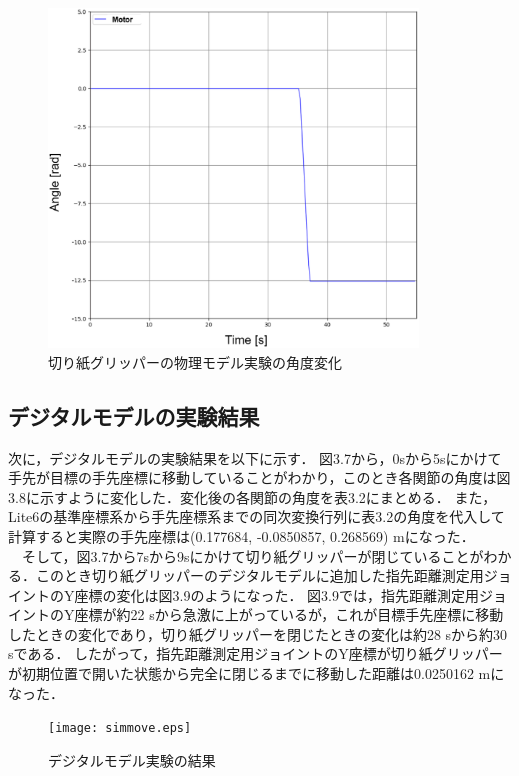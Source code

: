 \begin{figure}[htbt]
    \centering
     \includegraphics[height=90mm]{expt_8_dyna.eps}
     \caption{切り紙グリッパーの物理モデル実験の角度変化}
     \label{fig:f2}
\end{figure}

\subsection{デジタルモデルの実験結果}
次に，デジタルモデルの実験結果を以下に示す．
図3.7から，0sから5sにかけて手先が目標の手先座標に移動していることがわかり，このとき各関節の角度は図3.8に示すように変化した．変化後の各関節の角度を表3.2にまとめる．
また，Lite6の基準座標系から手先座標系までの同次変換行列に表3.2の角度を代入して計算すると実際の手先座標は(0.177684, -0.0850857, 0.268569) mになった．\\
　そして，図3.7から7sから9sにかけて切り紙グリッパーが閉じていることがわかる．このとき切り紙グリッパーのデジタルモデルに追加した指先距離測定用ジョイントのY座標の変化は図3.9のようになった．
図3.9では，指先距離測定用ジョイントのY座標が約22 sから急激に上がっているが，これが目標手先座標に移動したときの変化であり，切り紙グリッパーを閉じたときの変化は約28 sから約30 sである．
したがって，指先距離測定用ジョイントのY座標が切り紙グリッパーが初期位置で開いた状態から完全に閉じるまでに移動した距離は0.0250162 mになった．


\begin{figure}[htbt]
    \centering
     \texttt{[image: simmove.eps]}
     \caption{デジタルモデル実験の結果}
     \label{fig:f2}
\end{figure}

